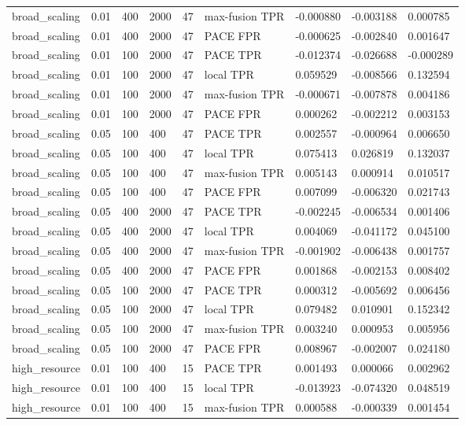 \begin{tabular}{lllllllll}
broad\_scaling & 0.01 & 400 & 2000 & 47 & max-fusion TPR & -0.000880 & -0.003188 & 0.000785 \\
broad\_scaling & 0.01 & 400 & 2000 & 47 & PACE FPR & -0.000625 & -0.002840 & 0.001647 \\
broad\_scaling & 0.01 & 100 & 2000 & 47 & PACE TPR & -0.012374 & -0.026688 & -0.000289 \\
broad\_scaling & 0.01 & 100 & 2000 & 47 & local TPR & 0.059529 & -0.008566 & 0.132594 \\
broad\_scaling & 0.01 & 100 & 2000 & 47 & max-fusion TPR & -0.000671 & -0.007878 & 0.004186 \\
broad\_scaling & 0.01 & 100 & 2000 & 47 & PACE FPR & 0.000262 & -0.002212 & 0.003153 \\
broad\_scaling & 0.05 & 100 & 400 & 47 & PACE TPR & 0.002557 & -0.000964 & 0.006650 \\
broad\_scaling & 0.05 & 100 & 400 & 47 & local TPR & 0.075413 & 0.026819 & 0.132037 \\
broad\_scaling & 0.05 & 100 & 400 & 47 & max-fusion TPR & 0.005143 & 0.000914 & 0.010517 \\
broad\_scaling & 0.05 & 100 & 400 & 47 & PACE FPR & 0.007099 & -0.006320 & 0.021743 \\
broad\_scaling & 0.05 & 400 & 2000 & 47 & PACE TPR & -0.002245 & -0.006534 & 0.001406 \\
broad\_scaling & 0.05 & 400 & 2000 & 47 & local TPR & 0.004069 & -0.041172 & 0.045100 \\
broad\_scaling & 0.05 & 400 & 2000 & 47 & max-fusion TPR & -0.001902 & -0.006438 & 0.001757 \\
broad\_scaling & 0.05 & 400 & 2000 & 47 & PACE FPR & 0.001868 & -0.002153 & 0.008402 \\
broad\_scaling & 0.05 & 100 & 2000 & 47 & PACE TPR & 0.000312 & -0.005692 & 0.006456 \\
broad\_scaling & 0.05 & 100 & 2000 & 47 & local TPR & 0.079482 & 0.010901 & 0.152342 \\
broad\_scaling & 0.05 & 100 & 2000 & 47 & max-fusion TPR & 0.003240 & 0.000953 & 0.005956 \\
broad\_scaling & 0.05 & 100 & 2000 & 47 & PACE FPR & 0.008967 & -0.002007 & 0.024180 \\
high\_resource & 0.01 & 100 & 400 & 15 & PACE TPR & 0.001493 & 0.000066 & 0.002962 \\
high\_resource & 0.01 & 100 & 400 & 15 & local TPR & -0.013923 & -0.074320 & 0.048519 \\
high\_resource & 0.01 & 100 & 400 & 15 & max-fusion TPR & 0.000588 & -0.000339 & 0.001454 \\

\end{tabular}
